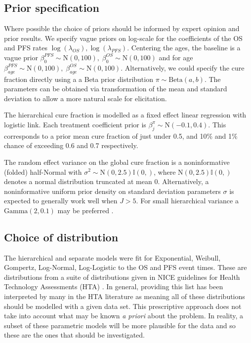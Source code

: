 \documentclass[AMA,STIX1COL]{WileyNJD-v2}
\begin{document}
%
\subsection{Prior specification}
Where possible the choice of priors should be informed by expert opinion and prior results.
We specify vague priors on log-scale for the coefficients of the OS and PFS rates $\log(\lambda_{OS}),  \log(\lambda_{PFS})$.
Centering the ages, the baseline is a vague prior ${\beta_0^{PFS} \sim \text{N}(0, 100),}\; {\beta_0^{OS} \sim \text{N}(0, 100)}$
and for age $\beta_{age}^{PFS} \sim \text{N}(0, 100),\; \beta_{age}^{OS} \sim \text{N}(0, 100)$.
Alternatively, we could specify the cure fraction directly using a a Beta prior distribution $\pi \sim \text{Beta}(a, b)$.
The parameters can be obtained via transformation of the mean and standard deviation to allow a more natural scale for elicitation.

The hierarchical cure fraction is modelled as a fixed effect linear regression with logistic link. Each treatment coefficient prior is $\beta^{\pi}_j \sim \text{N}(-0.1, 0.4)$.
This corresponds to a prior mean cure fraction of just under 0.5, and 10\% and 1\% chance of exceeding 0.6 and 0.7 respectively.  

The random effect variance on the global cure fraction is a noninformative (folded) half-Normal \cite{Gelman2006} with 
${\sigma^2 \sim \text{N}(0, 2.5)\mathbb{I}(0,)}$, where $\text{N}(0, 2.5)\mathbb{I}(0,)$ denotes a normal distribution truncated at mean 0.
Alternatively, a noninformative uniform prior density on standard deviation parameters $\sigma$ is expected to generally work well when $J > 5$.
For small hierarchical variance a $\text{Gamma}(2, 0.1)$ may be preferred \cite{Chung2013}.

%
\subsection{Choice of distribution}
The hierarchical and separate models were fit for Exponential, Weibull, Gompertz, Log-Normal, Log-Logistic to the OS and PFS event times.
These are distributions from a suite of distributions given in NICE guidelines for Health Technology Assessments (HTA) \cite{Latimer2011}.
In general, providing this list has been interpreted by many in the HTA literature as meaning all of these distributions should be modelled with a given data set.
This prescriptive approach does not take into account what may be known {\it a priori} about the problem.
In reality, a subset of these parametric models will be more plausible for the data and so these are the ones that should be investigated.
\end{document}
